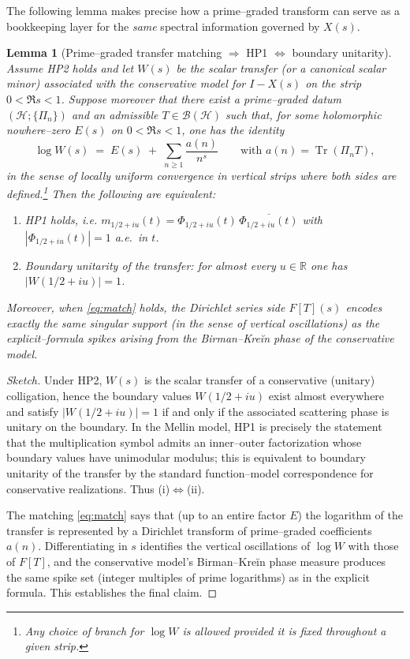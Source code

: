 \documentclass[11pt]{article}
\numberwithin{equation}{section}
\newtheorem{lemma}[theorem]{Lemma}
\theoremstyle{definition}
\theoremstyle{remark}
\newcommand{\Tr}{\operatorname{Tr}}
\newcommand{\1}{\mathbbm{1}}
\begin{document}
The following lemma makes precise how a prime–graded transform can serve as a bookkeeping layer for the \emph{same} spectral information governed by $X(s)$.

\begin{lemma}[Prime–graded transfer matching $\Rightarrow$ HP1 $\Leftrightarrow$ boundary unitarity]\label{lem:bridge}
Assume HP2 holds and let $W(s)$ be the scalar transfer (or a canonical scalar minor) associated with the conservative model for $I-X(s)$ on the strip $0<\Re s<1$. Suppose moreover that there exist a prime–graded datum $(\mathcal H;\{\Pi_n\})$ and an admissible $T\in\mathcal B(\mathcal H)$ such that, for some holomorphic nowhere–zero $E(s)$ on $0<\Re s<1$, one has the identity
\begin{equation}\label{eq:match}
\log W(s)\;=\;E(s)\;+\;\sum_{n\ge1}\frac{a(n)}{n^{s}}\qquad\text{with }a(n)=\Tr(\Pi_n T),
\end{equation}
in the sense of locally uniform convergence in vertical strips where both sides are defined.\footnote{Any choice of branch for $\log W$ is allowed provided it is fixed throughout a given strip.}
Then the following are equivalent:
\begin{enumerate}
\item[\emph{(i)}] \textup{HP1} holds, i.e. $m_{1/2+iu}(t)=\Phi_{1/2+iu}(t)\,\overline{\Phi_{1/2+iu}(t)}$ with $|\Phi_{1/2+iu}(t)|=1$ a.e.\ in $t$.
\item[\emph{(ii)}] \emph{Boundary unitarity of the transfer:} for almost every $u\in\mathbb R$ one has $|W(1/2+iu)|=1$.
\end{enumerate}
Moreover, when \eqref{eq:match} holds, the Dirichlet series side $F[T](s)$ encodes exactly the same singular support (in the sense of vertical oscillations) as the explicit–formula spikes arising from the Birman–Kreĭn phase of the conservative model.
\end{lemma}

\begin{proof}[Sketch]
Under HP2, $W(s)$ is the scalar transfer of a conservative (unitary) colligation, hence the boundary values $W(1/2+iu)$ exist almost everywhere and satisfy $|W(1/2+iu)|=1$ if and only if the associated scattering phase is unitary on the boundary. In the Mellin model, HP1 is precisely the statement that the multiplication symbol admits an inner–outer factorization whose boundary values have unimodular modulus; this is equivalent to boundary unitarity of the transfer by the standard function–model correspondence for conservative realizations. Thus (i)$\Leftrightarrow$(ii).

The matching \eqref{eq:match} says that (up to an entire factor $E$) the logarithm of the transfer is represented by a Dirichlet transform of prime–graded coefficients $a(n)$. Differentiating in $s$ identifies the vertical oscillations of $\log W$ with those of $F[T]$, and the conservative model’s Birman–Kreĭn phase measure produces the same spike set (integer multiples of prime logarithms) as in the explicit formula. This establishes the final claim.
\end{proof}
\end{document}
